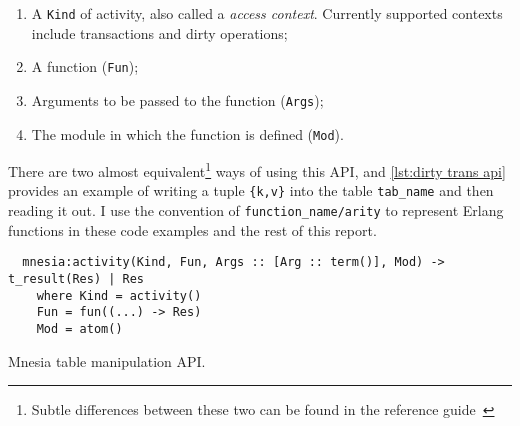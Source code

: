 \begin{enumerate}
  \item A \texttt{Kind} of activity, also called a \emph{access context}.
  Currently supported contexts include transactions and dirty operations;
  \item A function (\texttt{Fun});
  \item Arguments to be passed to the function (\texttt{Args});
  \item The module in which the function is defined (\texttt{Mod}).
\end{enumerate}

There are two almost equivalent\footnote{Subtle differences between these two 
can be found in the reference guide~\cite{ericssonab2023mnesiaref}} ways of 
using this API, and \cref{lst:dirty trans api} provides an example of
writing a tuple \verb|{k,v}| into the table \verb|tab_name| and then reading it out.
I use the convention of \verb|function_name/arity| to represent Erlang functions
in these code examples and the rest of this report.


\begin{listing}[htp]
  \centering
  \begin{verbatim}
  mnesia:activity(Kind, Fun, Args :: [Arg :: term()], Mod) -> t_result(Res) | Res 
    where Kind = activity()
    Fun = fun((...) -> Res)
    Mod = atom()
  \end{verbatim}
  \caption{Mnesia table manipulation API.}
  \label{lst:mnesia activity}
\end{listing}

